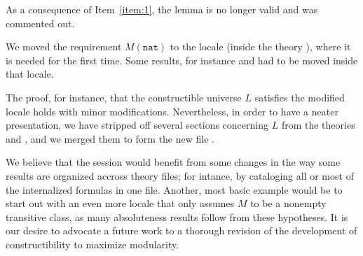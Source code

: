 As a consequence of Item~\ref{item:1}, the lemma
 is no longer valid and was commented
out.

We moved the requirement $M(\mathtt{nat})$ to the locale
 (inside the theory ), where it is needed for the first time. Some results,
for instance  and 
 had to be moved inside that
locale.

The proof, for instance, that the constructible universe $L$ satisfies
the modified locale  holds with minor
modifications. Nevertheless, in order to have a neater presentation,
we have stripped off several sections concerning $L$ from the theories
 and , and we merged them to form
the new file  . 

\medskip
{}
\medskip

We believe that the
 session  would benefit from some changes in
the way some results are organized accross theory files; for
intance, by cataloging all or most of the internalized formulas in one
file. Another, most basic example would be to start out with an even
more locale that only assumes $M$ to be a nonempty transitive class,
as many absoluteness results follow from these hypotheses.  
It is our desire to advocate a future work to a thorough
revision of the development of constructibility to maximize modularity.


